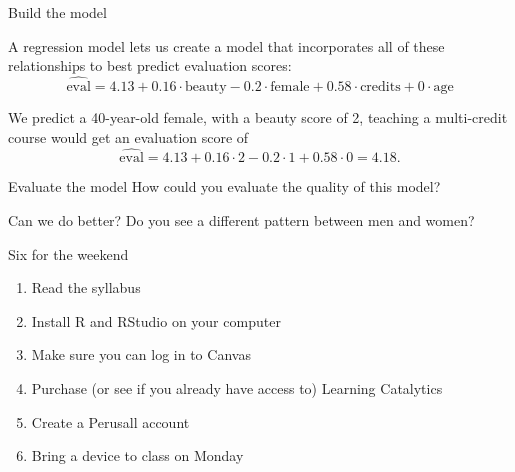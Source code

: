\documentclass{beamer}\usepackage[]{graphicx}\usepackage[]{color}
\newenvironment{knitrout}{}{} %
\begin{document}
\begin{darkframes}
    \begin{frame}{Build the model}
      
      \begin{center}
        A regression model lets us create a model that incorporates all of these relationships to best predict evaluation scores:
        \[
          \widehat{\text{eval}} = 
            4.13 +
            0.16 \cdot \text{beauty} -
            0.2 \cdot \text{female} +
            0.58 \cdot \text{credits} +
            0 \cdot \text{age}
        \]
        
        \pause
          
        We predict a 40-year-old female, with a beauty score of 2, teaching a multi-credit course would get an evaluation score of 
        \[
          \widehat{\text{eval}} = 4.13 + 0.16 \cdot 2 - 0.2 \cdot 1 + 0.58 \cdot 0 = 4.18.
        \]
        
      \end{center}
    \end{frame}

    \begin{frame}{Evaluate the model}
      How could you evaluate the quality of this model?
    \end{frame}

    \begin{frame}{Can we do better?}
      Do you see a different pattern between men and women?

\begin{knitrout}


\end{knitrout}
    \end{frame}

    \begin{frame}{Six for the weekend}
      \begin{enumerate}
        \item Read the syllabus
        \item Install R and RStudio on your computer
        \item Make sure you can log in to Canvas
        \item Purchase (or see if you already have access to) Learning Catalytics
        \item Create a Perusall account
        \item Bring a device to class on Monday
      \end{enumerate}
    \end{frame}


  \end{darkframes}
\end{document}
